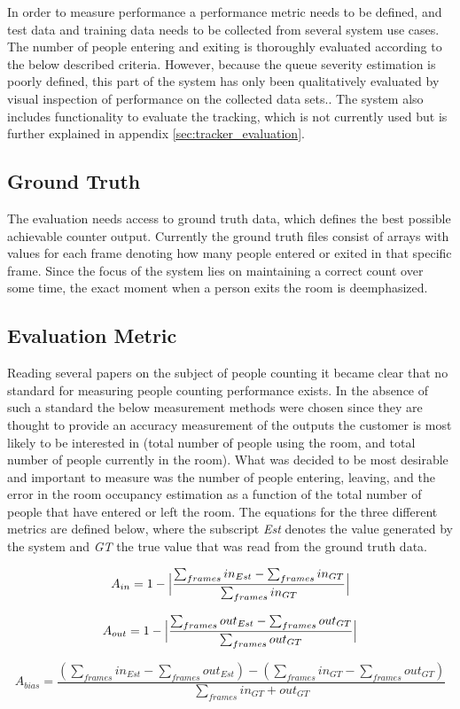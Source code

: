 In order to measure performance a performance metric needs to be defined, and test data and training data needs to be collected from several system use cases. The number of people entering and exiting is thoroughly evaluated according to the below described criteria. However, because the queue severity estimation is poorly defined, this part of the system has only been qualitatively evaluated by visual inspection of performance on the collected data sets.. The system also includes functionality to evaluate the tracking, which is not currently used but is further explained in appendix \ref{sec:tracker_evaluation}.

\subsection{Ground Truth}
The evaluation needs access to ground truth data, which defines the best possible achievable counter output. Currently the ground truth files consist of arrays with values for each frame denoting how many people entered or exited in that specific frame. Since the focus of the system lies on maintaining a correct count over some time, the exact moment when a person exits the room is deemphasized.

\subsection{Evaluation Metric}
Reading several papers on the subject of people counting it became clear that no standard for measuring people counting performance exists. In the absence of such a standard the below measurement methods were chosen since they are thought to provide an accuracy measurement of the outputs the customer is most likely to be interested in (total number of people using the room, and total number of people currently in the room).
What was decided to be most desirable and important to measure was the number of people entering, leaving, and the error in the room occupancy estimation as a function of the total number of people that have entered or left the room. The equations for the three different metrics are defined below, where the subscript \textit{Est} denotes the value generated by the system and \textit{GT} the true value that was read from the ground truth data.

\begin{equation}
\label{eq:in_accuracy}
A_{in} = 1 - \Big{\lvert}\frac{\sum_{frames}{in_{Est}}-\sum_{frames}{in_{GT}}}{\sum_{frames}in_{GT}}\Big{\rvert}
\end{equation} 

\begin{equation}
\label{eq:out_accuracy}
A_{out} = 1 - \Big{\lvert}\frac{\sum_{frames}{out_{Est}}-\sum_{frames}out_{GT}}{\sum_{frames}out_{GT}}\Big{\rvert} 
\end{equation} 

\begin{equation}
\label{eq:occupancy_bias}
A_{bias} = \frac{(\sum_{frames}{in_{Est}-\sum_{frames}out_{Est}})-(\sum_{frames}{in_{GT}-\sum_{frames}out_{GT}})}{\sum_{frames}in_{GT}+out_{GT}} 
\end{equation} 




